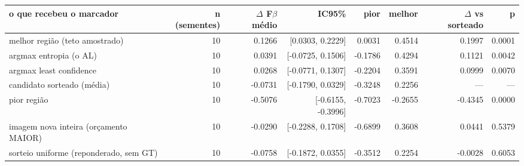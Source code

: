 \begin{tabular}{lrrrrrrr}
\hline
o que recebeu o marcador & n (sementes) & $\Delta$ F$\beta$ médio & IC95\% & pior & melhor & $\Delta$ vs sorteado & p \\
\hline
melhor região (teto amostrado) & 10 & 0.1266 & [0.0303, 0.2229] & 0.0031 & 0.4514 & 0.1997 & 0.0001 \\
argmax entropia (o AL) & 10 & 0.0391 & [-0.0725, 0.1506] & -0.1786 & 0.4294 & 0.1121 & 0.0042 \\
argmax least confidence & 10 & 0.0268 & [-0.0771, 0.1307] & -0.2204 & 0.3591 & 0.0999 & 0.0070 \\
candidato sorteado (média) & 10 & -0.0731 & [-0.1790, 0.0329] & -0.3248 & 0.2256 & --- & --- \\
pior região & 10 & -0.5076 & [-0.6155, -0.3996] & -0.7023 & -0.2655 & -0.4345 & 0.0000 \\
imagem nova inteira (orçamento MAIOR) & 10 & -0.0290 & [-0.2288, 0.1708] & -0.6899 & 0.3608 & 0.0441 & 0.5379 \\
sorteio uniforme (reponderado, sem GT) & 10 & -0.0758 & [-0.1872, 0.0355] & -0.3512 & 0.2254 & -0.0028 & 0.6053 \\
\hline
\end{tabular}
